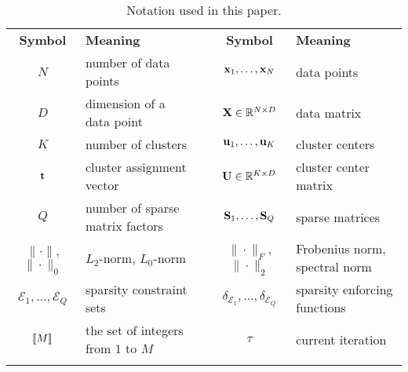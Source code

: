  


\begin{table}[t]
	\centering
	\begin{footnotesize}
	\begin{tabular}{cllcl}\\
		\cline{1-2}\cline{4-5}\vspace*{1mm}
		{\bf Symbol}  & {\bf Meaning}                      &  &    {\bf Symbol}          & {\bf Meaning}                    \\ 		\cline{1-2}\cline{4-5}
		$N$           & number of data points              &  &    ${\mathbf{x}}_1,\ldots, {\mathbf{x}}_N $        &    data points            \\
		$D$           & dimension of a data point          &  &    ${\mathbf{X}} \in\mathbb{R}^{N\times D}$&    data matrix            \\
		$K$           & number of clusters                 &  &    ${\mathbf{u}}_1,\ldots, {\mathbf{u}}_K $        &    cluster centers        \\
		${\mathbf{t}}$        & cluster assignment vector          &  &    ${\mathbf{U}}\in\mathbb{R}^{K\times D}$ &    cluster center matrix  \\
		$Q$           & number of sparse matrix factors    &  &    ${\mathbf{S}}_1, \ldots, {\mathbf{S}}_Q$        &    sparse matrices        \\
		$\|\cdot\|$, $\|\cdot\|_0$ & $L_2$-norm, $L_0$-norm&  &    $\|\cdot\|_F$, $\|\cdot\|_2$    &    Frobenius norm, spectral norm  \\
		$\mathcal{E}_1, \ldots, \mathcal{E}_Q$ & sparsity constraint sets           &  & $\delta_{\mathcal{E}_1},\ldots,\delta_{\mathcal{E}_Q}$ & 		sparsity enforcing functions   \\
		$\left \llbracket M\right \rrbracket$  & the set of integers from $1$ to $M$ &  & $\tau$  &                       		current iteration  \\
		\cline{1-2}\cline{4-5}        \\                                                                		
	\end{tabular}
	\end{footnotesize}
	
	\caption{Notation used in this paper.}
	\label{tab:notation}
\end{table}
\addtocounter{footnote}{0}




